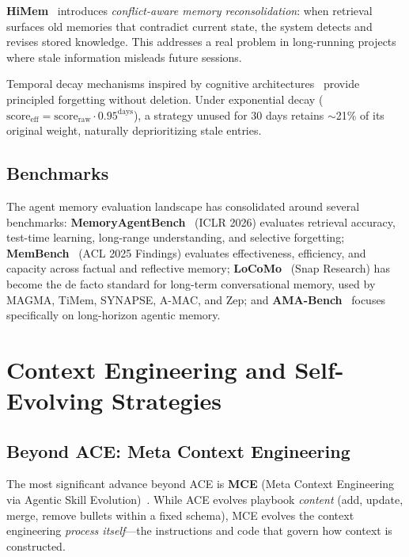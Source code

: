 \documentclass[11pt]{article}
\begin{document}
\textbf{HiMem}~\cite{himem} introduces \textit{conflict-aware memory reconsolidation}: when retrieval surfaces old memories that contradict current state, the system detects and revises stored knowledge. This addresses a real problem in long-running projects where stale information misleads future sessions.

Temporal decay mechanisms inspired by cognitive architectures~\cite{actr_forgetting} provide principled forgetting without deletion. Under exponential decay ($\text{score}_{\text{eff}} = \text{score}_{\text{raw}} \cdot 0.95^{\text{days}}$), a strategy unused for 30 days retains $\sim$21\% of its original weight, naturally deprioritizing stale entries.

\subsection{Benchmarks}

The agent memory evaluation landscape has consolidated around several benchmarks: \textbf{MemoryAgentBench}~\cite{memoryagentbench} (ICLR 2026) evaluates retrieval accuracy, test-time learning, long-range understanding, and selective forgetting; \textbf{MemBench}~\cite{membench} (ACL 2025 Findings) evaluates effectiveness, efficiency, and capacity across factual and reflective memory; \textbf{LoCoMo}~\cite{locomo} (Snap Research) has become the de facto standard for long-term conversational memory, used by MAGMA, TiMem, SYNAPSE, A-MAC, and Zep; and \textbf{AMA-Bench}~\cite{amabench} focuses specifically on long-horizon agentic memory.

\section{Context Engineering and Self-Evolving Strategies}
\label{sec:context}

\subsection{Beyond ACE: Meta Context Engineering}

The most significant advance beyond ACE is \textbf{MCE} (Meta Context Engineering via Agentic Skill Evolution)~\cite{mce}. While ACE evolves playbook \textit{content} (add, update, merge, remove bullets within a fixed schema), MCE evolves the context engineering \textit{process itself}---the instructions and code that govern how context is constructed.
\end{document}
